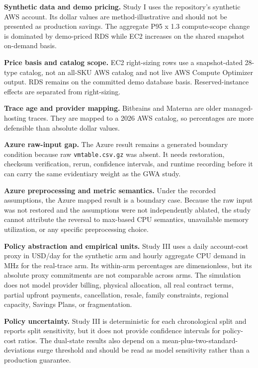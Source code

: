 \documentclass[11pt]{article}
\begin{document}
\textbf{Synthetic data and demo pricing.} Study I uses the repository's
synthetic AWS account. Its dollar values are method-illustrative and should
not be presented as production savings. The aggregate P95 x 1.3 compute-scope
change is dominated by demo-priced RDS while EC2 increases on the shared
snapshot on-demand basis.

\textbf{Price basis and catalog scope.} EC2 right-sizing rows use a
snapshot-dated 28-type catalog, not an all-SKU AWS catalog and not live AWS
Compute Optimizer output. RDS remains on the committed demo database basis.
Reserved-instance effects are separated from right-sizing.

\textbf{Trace age and provider mapping.} Bitbrains and Materna are older
managed-hosting traces. They are mapped to a 2026 AWS catalog, so percentages
are more defensible than absolute dollar values.

\textbf{Azure raw-input gap.} The Azure result remains a generated boundary
condition because raw \texttt{vmtable.csv.gz} was absent. It needs
restoration, checksum verification, rerun, confidence intervals, and runtime
recording before it can carry the same evidentiary weight as the GWA study.

\textbf{Azure preprocessing and metric semantics.} Under the recorded
assumptions, the Azure mapped result is a boundary case. Because the raw input
was not restored and the assumptions were not independently ablated, the
study cannot attribute the reversal to max-based CPU semantics, unavailable
memory utilization, or any specific preprocessing choice.

\textbf{Policy abstraction and empirical units.} Study III uses a daily
account-cost proxy in USD/day for the synthetic arm and hourly aggregate CPU
demand in MHz for the real-trace arm. Its within-arm percentages are
dimensionless, but its absolute proxy commitments are not comparable across
arms. The simulation does not model provider billing, physical allocation,
all real contract terms, partial upfront payments, cancellation, resale,
family constraints, regional capacity, Savings Plans, or fragmentation.

\textbf{Policy uncertainty.} Study III is deterministic for each
chronological split and reports split sensitivity, but it does not provide
confidence intervals for policy-cost ratios. The dual-state results also
depend on a mean-plus-two-standard-deviations surge threshold and should be
read as model sensitivity rather than a production guarantee.
\end{document}

